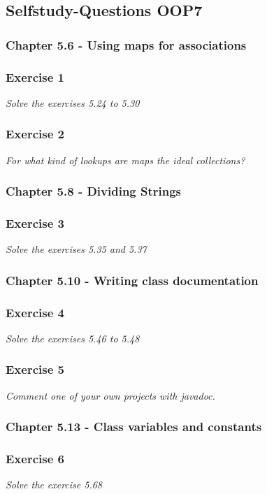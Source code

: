 \subsection{Selfstudy-Questions OOP7}

\subsubsection{Chapter 5.6 - Using maps for associations}

\subsubsection*{Exercise 1}
\textit{Solve the exercises 5.24 to 5.30} \\

\subsubsection*{Exercise 2}
\textit{For what kind of lookups are maps the ideal collections?} \\

\subsubsection{Chapter 5.8 - Dividing Strings}

\subsubsection*{Exercise 3}
\textit{Solve the exercises 5.35 and 5.37} \\

\subsubsection{Chapter 5.10 - Writing class documentation}

\subsubsection*{Exercise 4}
\textit{Solve the exercises 5.46 to 5.48} \\

\subsubsection*{Exercise 5}
\textit{Comment one of your own projects with javadoc.} \\

\subsubsection{Chapter 5.13 - Class variables and constants}

\subsubsection*{Exercise 6}
\textit{Solve the exercise 5.68} \\

